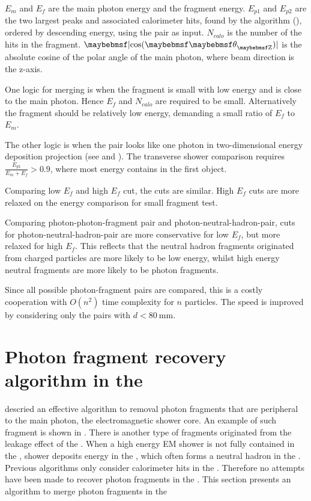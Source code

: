 $E_m$ and $E_f$ are the main photon energy and the fragment energy. $E_{p1}$ and $E_{p2}$ are the two largest peaks and associated calorimeter hits, found by the \peakFinding algorithm (), ordered by descending energy, using the pair as input. $N_{calo}$ is the number of the \ECAL hits in the fragment. $\absCosTheta$ is the absolute cosine of the polar angle of the main photon, where beam direction is the z-axis.

One logic for merging is when the fragment is small with low energy and is close to the main photon. Hence $E_f$  and $N_{calo}$ are required to be small. Alternatively the fragment should be relatively low energy, demanding a small ratio of $E_f$ to $E_m$.

The other logic is when the pair looks like one photon in two-dimensional energy deposition projection (see  and ). The transverse shower comparison requires $\frac{E_{p1}}{E_m + E_f} > 0.9 $, where most energy contains in the first \ShowerPeak object.

Comparing low $E_f$ and high $E_f$ cut, the cuts are similar. High $E_f$ cuts are more relaxed on the energy comparison for small fragment test.

Comparing photon-photon-fragment pair and photon-neutral-hadron-pair, cuts for photon-neutral-hadron-pair are more conservative for low $E_f$, but more relaxed for high $E_f$. This reflects that the neutral hadron fragments originated from charged particles are more likely to be low energy, whilst high energy neutral fragments are more likely to be photon fragments.

Since all possible photon-fragment pairs are compared, this is a costly cooperation with $O(n^2)$ time complexity for $n$ particles. The speed is improved by considering only the pairs with $d<80\ \text{mm}$.


\section{Photon fragment recovery algorithm in the \HCAL}
\label{sec:photonHighEFragRemoval}

 descried an effective algorithm to removal photon fragments that are peripheral to the main photon, the electromagnetic shower core. An example of such fragment is shown in . There is another type of fragments originated from the leakage effect of the \ECAL. When a high energy EM shower is not fully contained in the \ECAL, shower deposits energy in the \HCAL, which often forms a neutral hadron in the \HCAL. Previous algorithms only consider calorimeter hits in the \ECAL.  Therefore no attempts have been made to recover photon fragments in the \HCAL. This section presents an algorithm to merge photon fragments in the \HCAL

